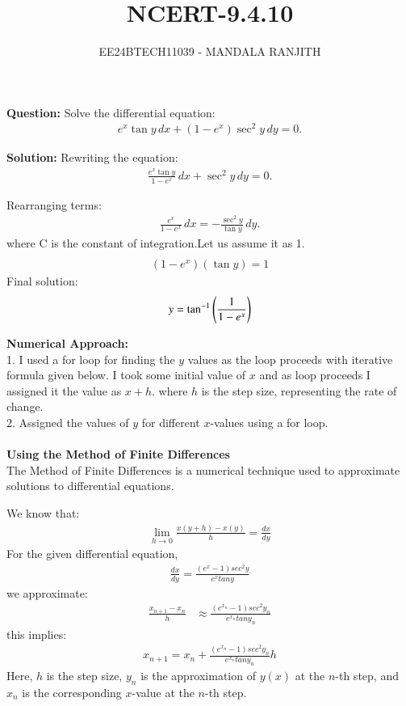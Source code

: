 \documentclass[article]{IEEEtran}
\numberwithin{figure}{enumi}
\begin{document}

\title{NCERT-9.4.10}
\author{EE24BTECH11039 - MANDALA RANJITH}
{\let\newpage\relax\maketitle}
\noindent\textbf{Question: }  
Solve the differential equation:  
\begin{align}
e^x \tan y \, dx + (1 - e^x) \sec^2 y \, dy = 0.
\end{align}

\noindent\textbf{Solution:}  
Rewriting the equation:  
\begin{align}
\frac{e^x \tan y}{1 - e^x} \, dx + \sec^2 y \, dy = 0.
\end{align}

\noindent Rearranging terms:  
\begin{align}
\frac{e^x}{1 - e^x} \, dx = -\frac{\sec^2 y}{\tan y} \, dy.
\end{align}
where C is the constant of integration.Let us assume it as 1.\\
\begin{align}
   \end{align}
\begin{align}
(1-e^x)(\tan y)=1
\end{align}
\noindent Final solution:  
\begin{align}
y=\tan^{-1}\left(\frac{1}{1-e^x}\right)
\end{align}

\noindent\textbf{Numerical Approach:}\\1. I used a for loop for finding the $y$ values as the loop proceeds with iterative formula given below. I took some initial value of $x$ and as loop proceeds I assigned it the value as $x+h$. where $h$ is the step size, representing the rate of change. 
\\2. Assigned the values of $y$ for different $x$-values using a for loop. \\ 
\\ \textbf{Using the Method of Finite Differences}\\
The Method of Finite Differences is a numerical technique used to approximate solutions to differential equations. 

We know that:
\begin{align}
   \lim_{h \to 0} \frac{x(y+h) - x(y)}{h} = \frac{dx}{dy} 
\end{align}
For the given differential equation,
\begin{align}
    \frac{dx}{dy}=\frac{(e^x-1) sec^2y}{e^x tany}
\end{align}
we approximate:
\begin{align}
\frac{x_{n+1} - x_n}{h} &\approx \frac{(e^{x_n}-1) sec^2y_n}{e^{x_n} tan{y_n}}
\end{align}
this implies:
\begin{align}
    {x_{n+1}}= {x_n + \frac{(e^{x_n}-1) sec^2y_n}{e^{x_n} tan{y_n}}}h
\end{align}
Here, $h$ is the step size, $y_n$ is the approximation of $y(x)$ at the $n$-th step, and $x_n$ is the corresponding $x$-value at the $n$-th step.
\end{document}
